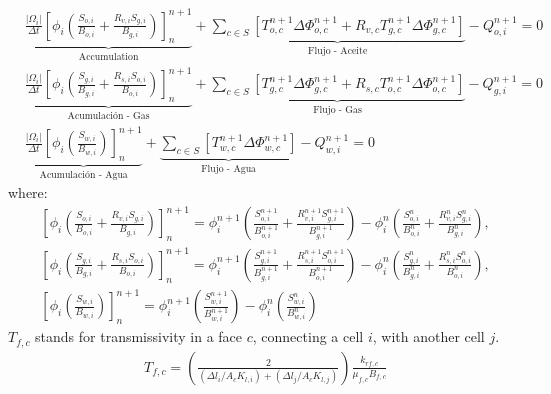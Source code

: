 \documentclass[review]{elsarticle}
\begin{document}
\begin{align}
\label{ec:aceiteDiscretizacion}&\underbrace{\frac{|\Omega_{i}|}{\Delta t}\left[ \phi_{i} \left( \frac{S_{o,i}}{B_{o,i}} + \frac{R_{v,i}S_{g,i}}{B_{g,i}}\right)\right]^{n+1}_{n}}_{\text{Accumulation}} + 
\underbrace{\sum_{c \in S}\left[ T^{n+1}_{o,c} \Delta{\Phi_{o,c}^{n+1}} + R_{v,c}T^{n+1}_{g,c} \Delta{\Phi_{g,c}^{n+1}} \right] }_{\text{Flujo - Aceite}} - Q_{o,i}^{n+1} = 0 \\
\label{ec:gasDiscretizacion}&\underbrace{\frac{|\Omega_{i}|}{\Delta t}\left[ \phi_{i} \left( \frac{S_{g,i}}{B_{g,i}} + \frac{R_{s,i}S_{o,i}}{B_{o,i}}\right)\right]^{n+1}_{n}}_{\text{Acumulación - Gas}} + 
\underbrace{\sum_{c \in S}\left[ T^{n+1}_{g,c}\Delta{\Phi_{g,c}^{n+1} + R_{s,c}T^{n+1}_{o,c} \Delta{\Phi_{o,c}^{n+1}}} \right] }_{\text{Flujo - Gas}} - Q_{g,i}^{n+1} = 0 \\
\label{ec:aguaDiscretizacion}&\underbrace{\frac{|\Omega_{i}|}{\Delta t}\left[ \phi_{i} \left( \frac{S_{w,i}}{B_{w,i}}\right)\right]^{n+1}_{n}}_{\text{Acumulación - Agua}}
+ 
\underbrace{\sum_{c \in S}\left[ T^{n+1}_{w,c}\Delta{\Phi_{w,c}^{n+1}} \right]}_{\text{Flujo - Agua}} - Q_{w,i}^{n+1} = 0 
\end{align}
where:
\begin{align*}
&\left[ \phi_{i} \left( \frac{S_{o,i}}{B_{o,i}} + \frac{R_{v,i}S_{g,i}}{B_{g,i}}\right)\right]^{n+1}_{n} = 
\phi^{n+1}_{i} \left( \frac{S_{o,i}^{n+1}}{B_{o,i}^{n+1}} + \frac{R_{v,i}^{n+1}S_{g,i}^{n+1}}{B_{g,i}^{n+1}}\right) - \phi^{n}_{i} \left( \frac{S_{o,i}^{n}}{B_{o,i}^{n}} + \frac{R_{v,i}^{n}S_{g,i}^{n}}{B_{g,i}^{n}}\right),\\
&\left[ \phi_{i} \left( \frac{S_{g,i}}{B_{g,i}} + \frac{R_{s,i}S_{o,i}}{B_{o,i}}\right)\right]^{n+1}_{n} = 
\phi^{n+1}_{i} \left( \frac{S_{g,i}^{n+1}}{B_{g,i}^{n+1}} + \frac{R_{s,i}^{n+1}S_{o,i}^{n+1}}{B_{o,i}^{n+1}}\right) - \phi^{n}_{i} \left( \frac{S_{g,i}^{n}}{B_{g,i}^{n}} + \frac{R_{s,i}^{n}S_{o,i}^{n}}{B_{o,i}^{n}}\right),\\
&\left[ \phi_{i} \left( \frac{S_{w,i}}{B_{w,i}}\right)\right]^{n+1}_{n} = 
\phi^{n+1}_{i} \left( \frac{S_{w,i}^{n+1}}{B_{w,i}^{n+1}}\right) - \phi^{n}_{i} \left( \frac{S_{w,i}^{n}}{B_{w,i}^{n}}\right)
\end{align*}
$T_{f,c}$ stands for transmissivity in a face $c$, connecting a cell $i$, with another cell $j$.
\begin{align}
\label{ec:Transmissibity}& T_{f,c} = \left(\frac{2}{(\Delta l_{i}/A_{c}K_{l,i})+(\Delta l_{j}/A_{c}K_{l,j})}\right)\frac{k_{rf,c}}{\mu_{f,c}B_{f,c}}
\end{align}
\end{document}
